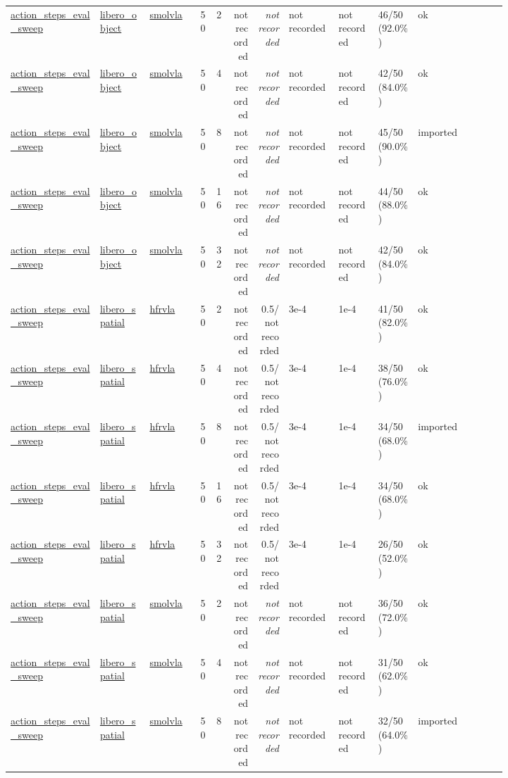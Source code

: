 \begin{tiny}
\begin{longtable}{@{}p{0.18\linewidth}p{0.10\linewidth}p{0.10\linewidth}rrrrp{0.10\linewidth}p{0.08\linewidth}p{0.08\linewidth}p{0.11\linewidth}p{0.07\linewidth}@{}}
\url{action_steps_eval_sweep} & \url{libero_object} & \url{smolvla} & 50 & 2 & not recorded & \emph{not recorded} & not recorded & not recorded & 46/50 (92.0\%) & ok \\
\url{action_steps_eval_sweep} & \url{libero_object} & \url{smolvla} & 50 & 4 & not recorded & \emph{not recorded} & not recorded & not recorded & 42/50 (84.0\%) & ok \\
\url{action_steps_eval_sweep} & \url{libero_object} & \url{smolvla} & 50 & 8 & not recorded & \emph{not recorded} & not recorded & not recorded & 45/50 (90.0\%) & imported \\
\url{action_steps_eval_sweep} & \url{libero_object} & \url{smolvla} & 50 & 16 & not recorded & \emph{not recorded} & not recorded & not recorded & 44/50 (88.0\%) & ok \\
\url{action_steps_eval_sweep} & \url{libero_object} & \url{smolvla} & 50 & 32 & not recorded & \emph{not recorded} & not recorded & not recorded & 42/50 (84.0\%) & ok \\
\url{action_steps_eval_sweep} & \url{libero_spatial} & \url{hfrvla} & 50 & 2 & not recorded & 0.5/not recorded & 3e-4 & 1e-4 & 41/50 (82.0\%) & ok \\
\url{action_steps_eval_sweep} & \url{libero_spatial} & \url{hfrvla} & 50 & 4 & not recorded & 0.5/not recorded & 3e-4 & 1e-4 & 38/50 (76.0\%) & ok \\
\url{action_steps_eval_sweep} & \url{libero_spatial} & \url{hfrvla} & 50 & 8 & not recorded & 0.5/not recorded & 3e-4 & 1e-4 & 34/50 (68.0\%) & imported \\
\url{action_steps_eval_sweep} & \url{libero_spatial} & \url{hfrvla} & 50 & 16 & not recorded & 0.5/not recorded & 3e-4 & 1e-4 & 34/50 (68.0\%) & ok \\
\url{action_steps_eval_sweep} & \url{libero_spatial} & \url{hfrvla} & 50 & 32 & not recorded & 0.5/not recorded & 3e-4 & 1e-4 & 26/50 (52.0\%) & ok \\
\url{action_steps_eval_sweep} & \url{libero_spatial} & \url{smolvla} & 50 & 2 & not recorded & \emph{not recorded} & not recorded & not recorded & 36/50 (72.0\%) & ok \\
\url{action_steps_eval_sweep} & \url{libero_spatial} & \url{smolvla} & 50 & 4 & not recorded & \emph{not recorded} & not recorded & not recorded & 31/50 (62.0\%) & ok \\
\url{action_steps_eval_sweep} & \url{libero_spatial} & \url{smolvla} & 50 & 8 & not recorded & \emph{not recorded} & not recorded & not recorded & 32/50 (64.0\%) & imported \\

\end{longtable}
\end{tiny}

